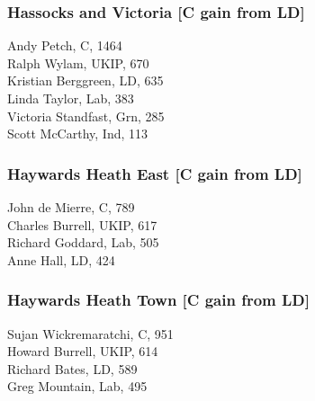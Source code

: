 \documentclass[a4paper,openany,10pt]{book}
\begin{document}
\subsubsection*{Hassocks and Victoria \hspace*{\fill}\nolinebreak[1]%
\enspace\hspace*{\fill}
[C gain from LD]}



Andy Petch, C, 1464\\
Ralph Wylam, UKIP, 670\\
Kristian Berggreen, LD, 635\\
Linda Taylor, Lab, 383\\
Victoria Standfast, Grn, 285\\
Scott McCarthy, Ind, 113\\


\subsubsection*{Haywards Heath East \hspace*{\fill}\nolinebreak[1]%
\enspace\hspace*{\fill}
[C gain from LD]}



John de Mierre, C, 789\\
Charles Burrell, UKIP, 617\\
Richard Goddard, Lab, 505\\
Anne Hall, LD, 424\\


\subsubsection*{Haywards Heath Town \hspace*{\fill}\nolinebreak[1]%
\enspace\hspace*{\fill}
[C gain from LD]}



Sujan Wickremaratchi, C, 951\\
Howard Burrell, UKIP, 614\\
Richard Bates, LD, 589\\
Greg Mountain, Lab, 495\\
\end{document}
